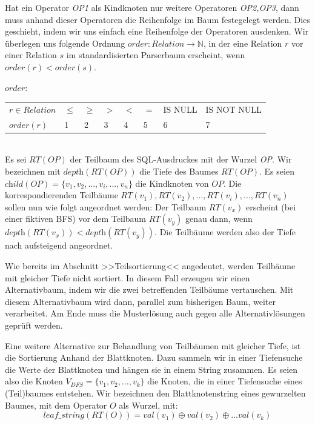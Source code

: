 Hat ein Operator \textit{OP1} als Kindknoten nur weitere Operatoren \textit{OP2,OP3}, dann muss anhand dieser Operatoren die Reihenfolge im Baum festegelegt werden. Dies geschieht, indem wir uns einfach eine Reihenfolge der Operatoren ausdenken. Wir überlegen uns folgende Ordnung $order:\textit{Relation}\to\mathbb{N}$, in der eine Relation $r$ vor einer Relation $s$ im standardisierten Parserbaum erscheint, wenn $order(r) < order(s)$.

$order:$\\

\begin{tabular}{|llllllll|}
\hline
$r\in \textit{Relation}$ & $\le$ & $\ge$ & $>$ & $<$ & $=$ & IS NULL & IS NOT NULL  \\
$\textit{order}(r)$ & 1 & 2 & 3 & 4 & 5 & 6 & 7\\ 
\hline
\end{tabular}\\

Es sei $\textit{RT}(\textit{OP})$ der Teilbaum des SQL-Ausdruckes mit der Wurzel \textit{OP}. Wir bezeichnen mit $\textit{depth}(\textit{RT}(\textit{OP}))$ die Tiefe des Baumes $\textit{RT}(\textit{OP})$. Es seien $\textit{child}(\textit{OP}) = \{v_1,v_2,...,v_i,...,v_n\}$ die Kindknoten von $\textit{OP}$. Die korrespondierenden Teilbäume $\textit{RT}(v_1),\textit{RT}(v_2),...,\textit{RT}(v_i),...,\textit{RT}(v_n)$ sollen nun wie folgt angeordnet werden: Der Teilbaum $\textit{RT}(v_x)$ erscheint (bei einer fiktiven BFS) vor dem Teilbaum $\textit{RT}(v_y)$ genau dann, wenn $\textit{depth}(\textit{RT}(v_x)) <  \textit{depth}(\textit{RT}(v_y))$. Die Teilbäume werden also der Tiefe nach aufsteigend angeordnet. 

Wie bereits im Abschnitt >>Teilsortierung<< angedeutet, werden Teilbäume mit gleicher Tiefe nicht sortiert. In diesem Fall erzeugen wir einen Alternativbaum, indem wir die zwei betreffenden Teilbäume vertauschen. Mit diesem Alternativbaum wird dann, parallel zum bisherigen Baum, weiter verarbeitet. Am Ende muss die Musterlösung auch gegen alle Alternativlösungen geprüft werden.

Eine weitere Alternative zur Behandlung von Teilbäumen mit gleicher Tiefe, ist die Sortierung Anhand der Blattknoten. Dazu sammeln wir in einer Tiefensuche die Werte der Blattknoten und hängen sie in einem String zusammen. Es seien also die Knoten $V_{DFS} = \{v_1,v_2,...,v_k\}$ die Knoten, die in einer Tiefensuche eines (Teil)baumes entstehen. Wir bezeichnen den Blattknotenstring eines gewurzelten Baumes, mit dem Operator $O$ als Wurzel, mit: $$\mathit{leaf\_string}(RT(O)) = \mathit{val}(v_1) \oplus \mathit{val}(v_2) \oplus ... \mathit{val}(v_k)$$

